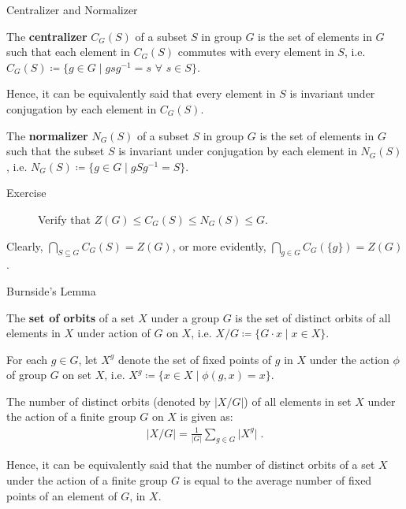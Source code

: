 \documentclass{beamer}
\newcommand\boldtext[1]{\textcolor{bolds}{\textbf{#1}}}
\begin{document}
\begin{frame}{Centralizer and Normalizer}
    \begin{definition}
        The \boldtext{centralizer} $C_G(S)$ of a subset $S$ in group $G$ is the set of elements in $G$ such that each element in $C_G(S)$ commutes with every element in $S$, i.e. $C_G(S)\coloneqq\{g\in G \mid gsg^{-1}=s$  $\forall$ $s\in S\}$.
    \end{definition}
    Hence, it can be equivalently said that every element in $S$ is invariant under conjugation by each element in $C_G(S)$.
    \begin{definition}
        The \boldtext{normalizer} $N_G(S)$ of a subset $S$ in group $G$ is the set of elements in $G$ such that the subset $S$ is invariant under conjugation by each element in $N_G(S)$, i.e. $N_G(S)\coloneqq\{g\in G \mid gSg^{-1}=S\}$.
    \end{definition}
    \begin{description}
        \item[Exercise] Verify that $Z(G)\leq C_G(S)\leq N_G(S)\leq G$.
    \end{description}
    Clearly, $\bigcap\limits_{S\subseteq G}C_G(S)=Z(G)$, or more evidently, $\bigcap\limits_{g\in G}C_G(\{g\})=Z(G)$.
\end{frame}

\begin{frame}{Burnside's Lemma}
    \begin{definition}
        The \boldtext{set of orbits} of a set $X$ under a group $G$ is the set of distinct orbits of all elements in $X$ under action of $G$ on $X$, i.e. $X/G\coloneqq\{G\cdot x\mid x\in X\}$.
    \end{definition}
    For each $g\in G$, let $X^g$ denote the set of fixed points of $g$ in $X$ under the action $\phi$ of group $G$ on set $X$, i.e. $X^g\coloneqq\{x\in X\mid\phi(g,x)=x\}$.
    \begin{lemma}
        The number of distinct orbits (denoted by $\lvert X/G\rvert$) of all elements in set $X$ under the action of a finite group $G$ on $X$ is given as:
        \vspace{-0.75em}
        \begin{align*}
            \lvert X/G\rvert=\frac{1}{\lvert G\rvert}\sum\limits_{g\in G}\lvert X^g\rvert \;.
        \end{align*}
    \end{lemma}
    Hence, it can be equivalently said that the number of distinct orbits of a set $X$ under the action of a finite group $G$ is equal to the average number of fixed points of an element of $G$, in $X$.
\end{frame}
\end{document}
